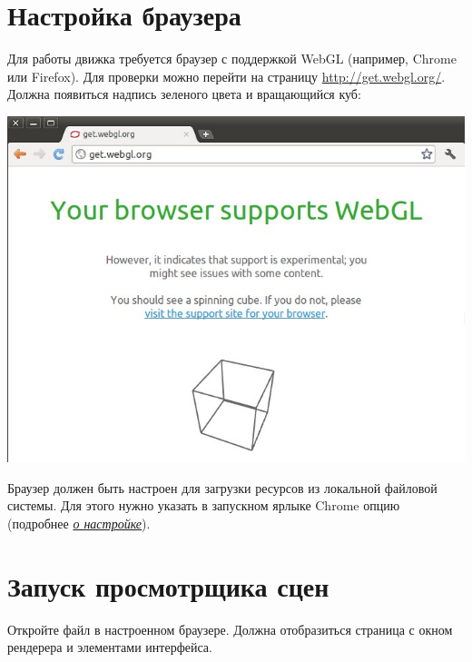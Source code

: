 \documentclass[a4paper,12pt,oneside]{sphinxmanual}
\begin{document}

\section{Настройка браузера}
\label{setup:index-0}\label{setup:getting-started-browser}\label{setup:id3}
Для работы движка требуется браузер с поддержкой WebGL (например, Chrome или
Firefox). Для проверки можно перейти на страницу \href{http://get.webgl.org/}{http://get.webgl.org/}. Должна
появиться надпись зеленого цвета и вращающийся куб:

{\hfill\includegraphics[width=1.000\linewidth]{browser_supports_webgl.jpg}\hfill}

Браузер должен быть настроен для загрузки ресурсов из локальной файловой системы. Для этого нужно указать в запускном ярлыке Chrome опцию  (подробнее {\hyperref[problems_and_solutions:browser-for-local-loading]{\emph{о настройке}}}).


\section{Запуск просмотрщика сцен}
\label{setup:id4}\label{setup:getting-started-launching-viewer}\label{setup:index-2}
Откройте файл  в настроенном браузере. Должна отобразиться страница с окном рендерера и элементами интерфейса.
\end{document}

